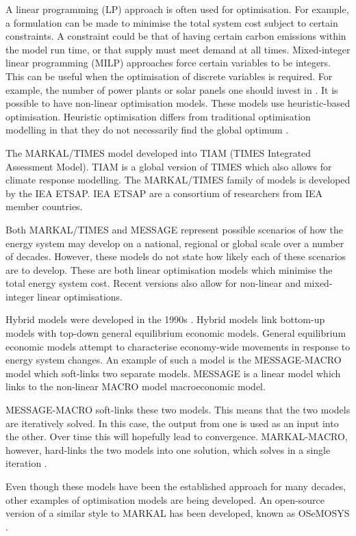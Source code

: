 A linear programming (LP) approach is often used for optimisation. For example, a formulation can be made to minimise the total system cost subject to certain constraints. A constraint could be that of having certain carbon emissions within the model run time, or that supply must meet demand at all times. Mixed-integer linear programming (MILP) approaches force certain variables to be integers. This can be useful when the optimisation of discrete variables is required. For example, the number of power plants or solar panels one should invest in \cite{Ringkjob2018}. It is possible to have non-linear optimisation models. These models use heuristic-based optimisation. Heuristic optimisation differs from traditional optimisation modelling in that they do not necessarily find the global optimum \cite{Banos2011}.  

The MARKAL/TIMES model developed into TIAM (TIMES Integrated Assessment Model). TIAM is a global version of TIMES which also allows for climate response modelling. The MARKAL/TIMES family of models is developed by the IEA ETSAP. IEA ETSAP are a consortium of researchers from IEA member countries.

Both MARKAL/TIMES and MESSAGE represent possible scenarios of how the energy system may develop on a national, regional or global scale over a number of decades. However, these models do not state how likely each of these scenarios are to develop. These are both linear optimisation models which minimise the total energy system cost. Recent versions also allow for non-linear and mixed-integer linear optimisations.

Hybrid models were developed in the 1990s \cite{Economics2016}. Hybrid models link bottom-up models with top-down general equilibrium economic models. General equilibrium economic models attempt to characterise economy-wide movements in response to energy system changes. An example of such a model is the MESSAGE-MACRO model \cite{Messner2000} which soft-links two separate models. MESSAGE is a linear model which links to the non-linear MACRO model macroeconomic model. 

MESSAGE-MACRO soft-links these two models. This means that the two models are iteratively solved. In this case, the output from one is used as an input into the other. Over time this will hopefully lead to convergence. MARKAL-MACRO, however, hard-links the two models into one solution, which solves in a single iteration \cite{mannewene92}.

Even though these models have been the established approach for many decades, other examples of optimisation models are being developed. An open-source version of a similar style to MARKAL has been developed, known as OSeMOSYS \cite{Howells2011}. 


